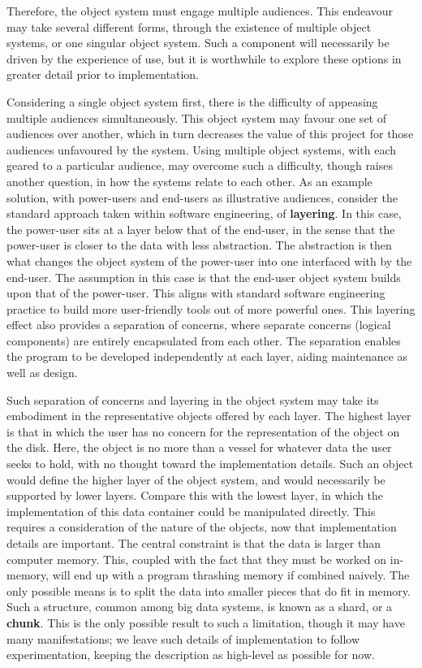 Therefore, the object system must engage multiple audiences.
This endeavour may take several different forms, through the existence of multiple object systems, or one singular object system.
Such a component will necessarily be driven by the experience of use, but it is worthwhile to explore these options in greater detail prior to implementation.

Considering a single object system first, there is the difficulty of appeasing multiple audiences simultaneously.
This object system may favour one set of audiences over another, which in turn decreases the value of this project for those audiences unfavoured by the system.
Using multiple object systems, with each geared to a particular audience, may overcome such a difficulty, though raises another question, in how the systems relate to each other.
As an example solution, with power-users and end-users as illustrative audiences, consider the standard approach taken within software engineering, of \textbf{layering}.
In this case, the power-user sits at a layer below that of the end-user, in the sense that the power-user is closer to the data with less abstraction.
The abstraction is then what changes the object system of the power-user into one interfaced with by the end-user.
The assumption in this case is that the end-user object system builds upon that of the power-user.
This aligns with standard software engineering practice to build more user-friendly tools out of more powerful ones\cite{raymond2003}.
This layering effect also provides a separation of concerns, where separate concerns (logical components) are entirely encapsulated from each other.
The separation enables the program to be developed independently at each layer, aiding maintenance as well as design.

Such separation of concerns and layering in the object system may take its embodiment in the representative objects offered by each layer.
The highest layer is that in which the user has no concern for the representation of the object on the disk.
Here, the object is no more than a vessel for whatever data the user seeks to hold, with no thought toward the implementation details.
Such an object would define the higher layer of the object system, and would necessarily be supported by lower layers.
Compare this with the lowest layer, in which the implementation of this data container could be manipulated directly.
This requires a consideration of the nature of the objects, now that implementation details are important.
The central constraint is that the data is larger than computer memory.
This, coupled with the fact that they must be worked on in-memory, will end up with a program thrashing memory if combined naively.
The only possible means is to split the data into smaller pieces that do fit in memory.
Such a structure, common among big data systems, is known as a shard, or a \textbf{chunk}.
This is the only possible result to such a limitation, though it may have many manifestations; we leave such details of implementation to follow experimentation, keeping the description as high-level as possible for now.

